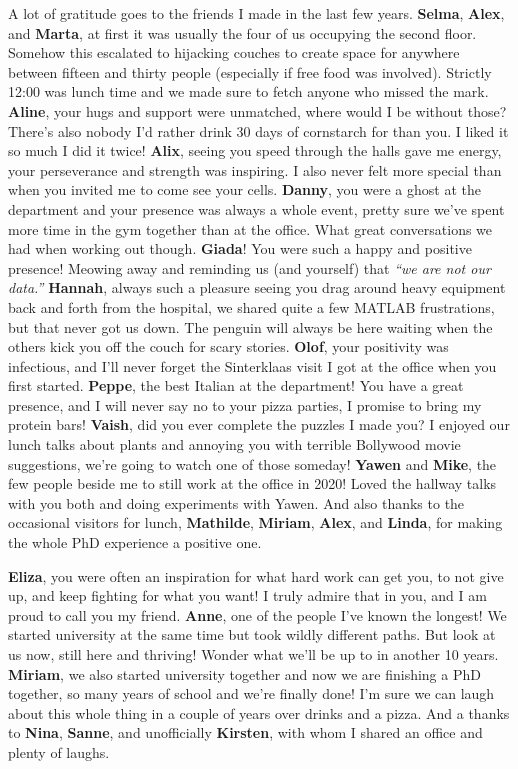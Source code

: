 \begin{refsection}
A lot of gratitude goes to the friends I made in the last few years. \textbf{Selma}, \textbf{Alex}, and \textbf{Marta}, at first it was usually the four of us occupying the second floor. Somehow this escalated to hijacking couches to create space for anywhere between fifteen and thirty people (especially if free food was involved). Strictly 12:00 was lunch time and we made sure to fetch anyone who missed the mark. \textbf{Aline}, your hugs and support were unmatched, where would I be without those? There’s also nobody I’d rather drink 30 days of cornstarch for than you. I liked it so much I did it twice! \textbf{Alix}, seeing you speed through the halls gave me energy, your perseverance and strength was inspiring. I also never felt more special than when you invited me to come see your cells. \textbf{Danny}, you were a ghost at the department and your presence was always a whole event, pretty sure we’ve spent more time in the gym together than at the office. What great conversations we had when working out though. \textbf{Giada}! You were such a happy and positive presence! Meowing away and reminding us (and yourself) that \textit{“we are not our data.”} \textbf{Hannah}, always such a pleasure seeing you drag around heavy equipment back and forth from the hospital, we shared quite a few MATLAB frustrations, but that never got us down. The penguin will always be here waiting when the others kick you off the couch for scary stories. \textbf{Olof}, your positivity was infectious, and I’ll never forget the Sinterklaas visit I got at the office when you first started. \textbf{Peppe}, the best Italian at the department! You have a great presence, and I will never say no to your pizza parties, I promise to bring my protein bars! \textbf{Vaish}, did you ever complete the puzzles I made you? I enjoyed our lunch talks about plants and annoying you with terrible Bollywood movie suggestions, we’re going to watch one of those someday! \textbf{Yawen} and \textbf{Mike}, the few people beside me to still work at the office in 2020! Loved the hallway talks with you both and doing experiments with Yawen. And also thanks to the occasional visitors for lunch, \textbf{Mathilde}, \textbf{Miriam}, \textbf{Alex}, and \textbf{Linda}, for making the whole PhD experience a positive one. 

\textbf{Eliza}, you were often an inspiration for what hard work can get you, to not give up, and keep fighting for what you want! I truly admire that in you, and I am proud to call you my friend. \textbf{Anne}, one of the people I’ve known the longest! We started university at the same time but took wildly different paths. But look at us now, still here and thriving! Wonder what we’ll be up to in another 10 years. \textbf{Miriam}, we also started university together and now we are finishing a PhD together, so many years of school and we’re finally done! I’m sure we can laugh about this whole thing in a couple of years over drinks and a pizza. And a thanks to \textbf{Nina}, \textbf{Sanne}, and unofficially \textbf{Kirsten}, with whom I shared an office and plenty of laughs.


\end{refsection}
